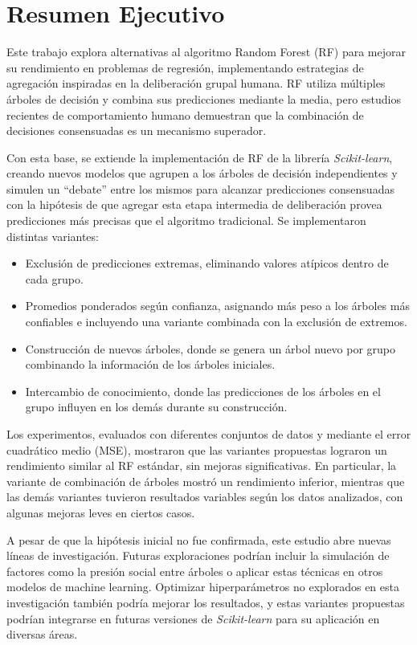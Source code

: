 %

\chapter{Resumen Ejecutivo}
\label{sec::resumen}

Este trabajo explora alternativas al algoritmo Random Forest (RF) para mejorar su rendimiento en problemas de regresión, implementando estrategias de agregación inspiradas en la deliberación grupal humana. RF utiliza múltiples árboles de decisión y combina sus predicciones mediante la media, pero estudios recientes de comportamiento humano demuestran que la combinación de decisiones consensuadas es un mecanismo superador.

Con esta base, se extiende la implementación de RF de la librería \textit{Scikit-learn}, creando nuevos modelos que agrupen a los árboles de decisión independientes y simulen un “debate” entre los mismos para alcanzar predicciones consensuadas con la hipótesis de que agregar esta etapa intermedia de deliberación provea predicciones más precisas que el algoritmo tradicional. Se implementaron distintas variantes:

\begin{itemize}
    \item Exclusión de predicciones extremas, eliminando valores atípicos dentro de cada grupo.
    \item Promedios ponderados según confianza, asignando más peso a los árboles más confiables e incluyendo una variante combinada con la exclusión de extremos.
    \item Construcción de nuevos árboles, donde se genera un árbol nuevo por grupo combinando la información de los árboles iniciales.
    \item Intercambio de conocimiento, donde las predicciones de los árboles en el grupo influyen en los demás durante su construcción.
\end{itemize}

Los experimentos, evaluados con diferentes conjuntos de datos y mediante el error cuadrático medio (MSE), mostraron que las variantes propuestas lograron un rendimiento similar al RF estándar, sin mejoras significativas. En particular, la variante de combinación de árboles mostró un rendimiento inferior, mientras que las demás variantes tuvieron resultados variables según los datos analizados, con algunas mejoras leves en ciertos casos.

A pesar de que la hipótesis inicial no fue confirmada, este estudio abre nuevas líneas de investigación. Futuras exploraciones podrían incluir la simulación de factores como la presión social entre árboles o aplicar estas técnicas en otros modelos de machine learning. Optimizar hiperparámetros no explorados en esta investigación también podría mejorar los resultados, y estas variantes propuestas podrían integrarse en futuras versiones de \textit{Scikit-learn} para su aplicación en diversas áreas.
